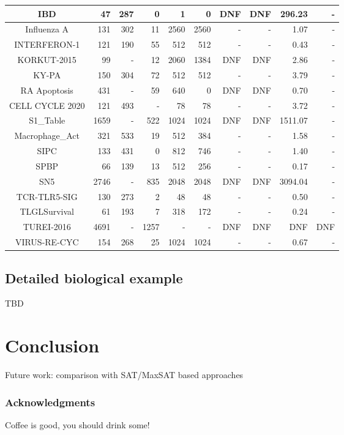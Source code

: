 \documentclass[runningheads]{llncs}
\begin{document}
\begin{table}[!ht]
\begin{tabular}{|c|r|r|r|r|r|r|r|r|r|}
IBD & 47 & 287 & 0 & 1 & 0 & DNF & DNF & 296.23 & - \\ \hline
Influenza A & 131 & 302 & 11 & 2560 & 2560 & - & - & 1.07 & - \\ \hline
INTERFERON-1 & 121 & 190 & 55 & 512 & 512 & - & - & 0.43 & - \\ \hline
KORKUT-2015 & 99 & - & 12 & 2060 & 1384 & DNF & DNF & 2.86 & - \\ \hline
KY-PA & 150 & 304 & 72 & 512 & 512 & - & - & 3.79 & - \\ \hline
RA Apoptosis & 431 & - & 59 & 640 & 0 & DNF & DNF & 0.70 & - \\ \hline
CELL CYCLE 2020 & 121 & 493 & - & 78 & 78 & - & - & 3.72 & - \\ \hline
S1\_Table & 1659 & - & 522 & 1024 & 1024 & DNF & DNF & 1511.07 & - \\ \hline
Macrophage\_Act & 321 & 533 & 19 & 512 & 384 & - & - & 1.58 & - \\ \hline
SIPC & 133 & 431 & 0 & 812 & 746 & - & - & 1.40 & - \\ \hline
SPBP & 66 & 139 & 13 & 512 & 256 & - & - & 0.17 & - \\ \hline
SN5 & 2746 & - & 835 & 2048 & 2048 & DNF & DNF & 3094.04 & - \\ \hline
TCR-TLR5-SIG & 130 & 273 & 2 & 48 & 48 & - & - & 0.50 & - \\ \hline
TLGLSurvival & 61 & 193 & 7 & 318 & 172 & - & - & 0.24 & - \\ \hline
TUREI-2016 & 4691 & - & 1257 & - & - & DNF & DNF & DNF & DNF \\ \hline
VIRUS-RE-CYC & 154 & 268 & 25 & 1024 & 1024 & - & - & 0.67 & - \\ \hline
\end{tabular}
\end{table}

\subsection{Detailed biological example}

TBD

\section{Conclusion}

Future work: comparison with SAT/MaxSAT based approaches~\cite{nabli2016enumerating}

\subsubsection{Acknowledgments}
Coffee is good, you should drink some!



\end{document}
